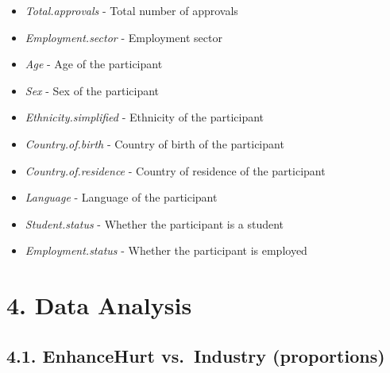 \documentclass[
]{article}
\begin{document}
\begin{itemize}
\item
  \emph{Total.approvals} - Total number of approvals
\item
  \emph{Employment.sector} - Employment sector
\item
  \emph{Age} - Age of the participant
\item
  \emph{Sex} - Sex of the participant
\item
  \emph{Ethnicity.simplified} - Ethnicity of the participant
\item
  \emph{Country.of.birth} - Country of birth of the participant
\item
  \emph{Country.of.residence} - Country of residence of the participant
\item
  \emph{Language} - Language of the participant
\item
  \emph{Student.status} - Whether the participant is a student
\item
  \emph{Employment.status} - Whether the participant is employed
\end{itemize}

\hypertarget{data-analysis}{%
\section{4. Data Analysis}\label{data-analysis}}

\hypertarget{enhancehurt-vs.-industry-proportions}{%
\subsection{4.1. EnhanceHurt vs.~Industry
(proportions)}\label{enhancehurt-vs.-industry-proportions}}
\end{document}
